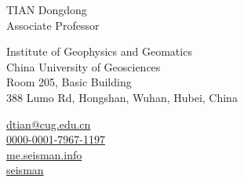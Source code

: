 \documentclass[11pt,a4paper]{article}
\makeatletter
\newcommand{\Name}{TIAN Dongdong}
\newcommand{\CNName}{田冬冬}
\newcommand{\Role}{Associate Professor}
\newcommand{\Email}{dtian@cug.edu.cn}
\newcommand{\Website}{me.seisman.info}
\newcommand{\Github}{seisman}
\newcommand{\Orcid}{0000-0001-7967-1197}
\newcommand{\Affiliation}{Institute of Geophysics and Geomatics \\ China University of Geosciences}
\newcommand{\Address}{Room 205, Basic Building \\ 388 Lumo Rd, Hongshan, Wuhan, Hubei, China}
\makeatother
\begin{document}
\thispagestyle{empty} %
{
\begin{center}
{\fontsize{24pt}{0}\selectfont \Name \hspace{1ex} \kaishu{\CNName}} \\[0.4cm]
{\fontsize{16pt}{0}\selectfont \Role} \\[0.2cm]
\end{center}
\begin{minipage}[t]{0.7\textwidth}
  \fontsize{12pt}{15pt}\selectfont
  \Affiliation
  \\
  \Address
\end{minipage}
\begin{minipage}[t]{0.3\textwidth}
  \fontsize{12pt}{15pt}\selectfont
  \begin{flushleft}
    \faEnvelope \href{mailto:\Email}{\Email}
	\\
	\faOrcid \href{https://orcid.org/\Orcid}{\Orcid}
	\\
    \faGlobe \href{https://\Website}{\Website}
	\\
	\faGithub \href{https://github.com/\Github}{\Github}
  \end{flushleft}
\end{minipage}
}
\vspace{0.2cm}













\end{document}

